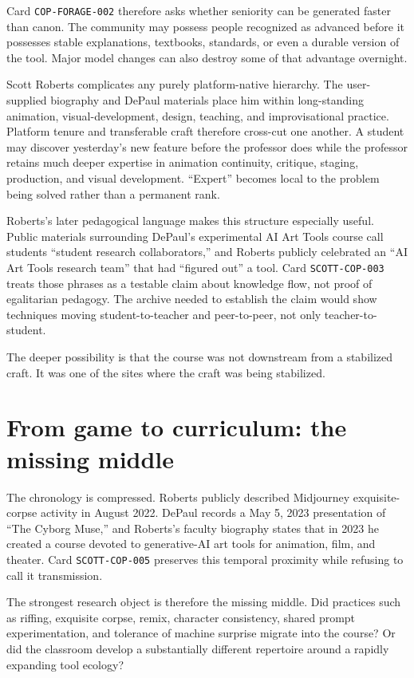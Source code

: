 \documentclass[11pt]{article}
\begin{document}
Card \texttt{COP-FORAGE-002} therefore asks whether seniority can be generated faster than canon. The community may possess people recognized as advanced before it possesses stable explanations, textbooks, standards, or even a durable version of the tool. Major model changes can also destroy some of that advantage overnight.

Scott Roberts complicates any purely platform-native hierarchy. The user-supplied biography and DePaul materials place him within long-standing animation, visual-development, design, teaching, and improvisational practice. Platform tenure and transferable craft therefore cross-cut one another. A student may discover yesterday's new feature before the professor does while the professor retains much deeper expertise in animation continuity, critique, staging, production, and visual development. ``Expert'' becomes local to the problem being solved rather than a permanent rank.

Roberts's later pedagogical language makes this structure especially useful. Public materials surrounding DePaul's experimental AI Art Tools course call students ``student research collaborators,'' and Roberts publicly celebrated an ``AI Art Tools research team'' that had ``figured out'' a tool. Card \texttt{SCOTT-COP-003} treats those phrases as a testable claim about knowledge flow, not proof of egalitarian pedagogy. The archive needed to establish the claim would show techniques moving student-to-teacher and peer-to-peer, not only teacher-to-student.

The deeper possibility is that the course was not downstream from a stabilized craft. It was one of the sites where the craft was being stabilized.

\section{From game to curriculum: the missing middle}

The chronology is compressed. Roberts publicly described Midjourney exquisite-corpse activity in August 2022. DePaul records a May 5, 2023 presentation of ``The Cyborg Muse,'' and Roberts's faculty biography states that in 2023 he created a course devoted to generative-AI art tools for animation, film, and theater. Card \texttt{SCOTT-COP-005} preserves this temporal proximity while refusing to call it transmission.

The strongest research object is therefore the missing middle. Did practices such as riffing, exquisite corpse, remix, character consistency, shared prompt experimentation, and tolerance of machine surprise migrate into the course? Or did the classroom develop a substantially different repertoire around a rapidly expanding tool ecology?
\end{document}
